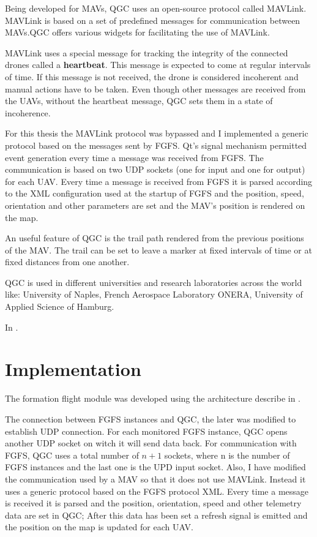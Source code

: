 Being developed for MAVs,  QGC uses
an open-source protocol called MAVLink. MAVLink is based on a set of predefined
messages for communication between MAVs.QGC offers various widgets for facilitating
the use of MAVLink.

MAVLink uses a special message for tracking the integrity of the connected drones
called a \textbf{heartbeat}. This message is expected to come at regular intervals
of time. If this message is not received, the drone is considered incoherent
and manual actions have to be taken. Even though other messages are received from
the UAVs, without the heartbeat message, QGC sets them in a state of incoherence.

For this thesis the MAVLink protocol was bypassed and I implemented a generic
protocol based on the messages sent by FGFS. Qt's signal mechanism permitted
event generation every time a message was received from FGFS. The communication
is based on two UDP sockets (one for input and one for output) for each UAV. 
Every time a message is received from FGFS it is parsed according to the XML 
configuration used at the startup of FGFS and the position, speed, orientation
and other parameters are set and the MAV's position is rendered on the map.

An useful feature of QGC is the trail path rendered from the previous positions
of the MAV. The trail can be set to leave a marker at fixed intervals of time
or at fixed distances from one another.

QGC is used in different universities and research laboratories across the world 
like: University of Naples, French Aerospace Laboratory ONERA,  University of 
Applied Science of Hamburg.

In .


\section{Implementation}
\label{sec:code}

The formation flight module was developed using the architecture describe in 
.

The connection between FGFS instances and QGC, the later was modified to establish
UDP connection. For each monitored FGFS instance,  QGC opens another UDP socket
on witch it will send data back. For communication with FGFS, QGC uses a total
number of $n+1$ sockets, where n is the number of FGFS instances and the last
one is the UPD input socket. Also, I have modified the communication used
by a MAV so that it does not use MAVLink. Instead it uses a generic protocol
based on the FGFS protocol XML. Every time a message is received it is parsed
and the position, orientation, speed and other telemetry data are set in 
QGC; After this data has been set a refresh signal is emitted and the position
on the map is updated for each UAV.

